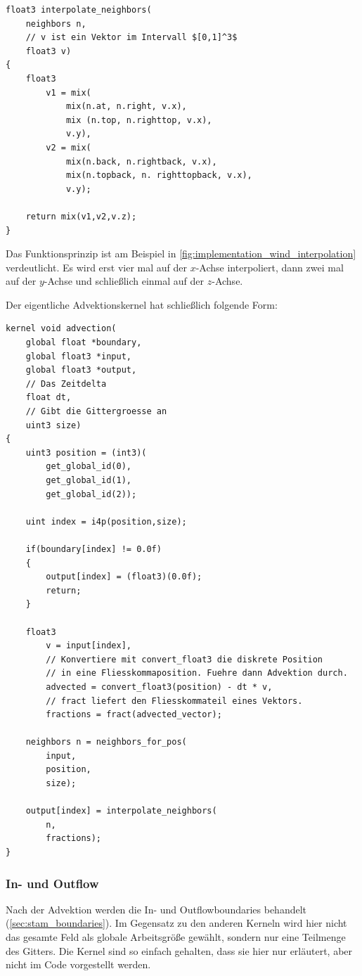 \begin{verbatim}
float3 interpolate_neighbors(
    neighbors n,
    // v ist ein Vektor im Intervall $[0,1]^3$
    float3 v)
{
    float3
        v1 = mix(
            mix(n.at, n.right, v.x),
            mix (n.top, n.righttop, v.x),
            v.y),
        v2 = mix(
            mix(n.back, n.rightback, v.x),
            mix(n.topback, n. righttopback, v.x),
            v.y);

    return mix(v1,v2,v.z);
}
\end{verbatim}

Das Funktionsprinzip ist am Beispiel in
\autoref{fig:implementation_wind_interpolation} verdeutlicht. Es wird
erst vier mal auf der $x$-Achse interpoliert, dann zwei mal auf der
$y$-Achse und schließlich einmal auf der $z$-Achse.

Der eigentliche Advektionskernel hat schließlich folgende Form:

\begin{verbatim}
kernel void advection(
    global float *boundary,
    global float3 *input,
    global float3 *output,
    // Das Zeitdelta
    float dt,
    // Gibt die Gittergroesse an
    uint3 size)
{
    uint3 position = (int3)(
        get_global_id(0),
        get_global_id(1),
        get_global_id(2));

    uint index = i4p(position,size);

    if(boundary[index] != 0.0f)
    {
        output[index] = (float3)(0.0f);
        return;
    }

    float3
        v = input[index],
        // Konvertiere mit convert_float3 die diskrete Position
        // in eine Fliesskommaposition. Fuehre dann Advektion durch.
        advected = convert_float3(position) - dt * v,
        // fract liefert den Fliesskommateil eines Vektors.
        fractions = fract(advected_vector);

    neighbors n = neighbors_for_pos(
        input,
        position,
        size);

    output[index] = interpolate_neighbors(
        n,
        fractions);
}
\end{verbatim}

\subsubsection{In- und Outflow}
\label{sec:implementaion_wind_in_outflow}

Nach der Advektion werden die In- und Outflowboundaries behandelt
(\Pimiddyvgl \autoref{sec:stam_boundaries}). Im Gegensatz zu den anderen
Kerneln wird hier nicht das gesamte Feld als globale Arbeitsgröße
gewählt, sondern nur eine Teilmenge des Gitters. Die Kernel sind so
einfach gehalten, dass sie hier nur erläutert, aber nicht im Code
vorgestellt werden.

